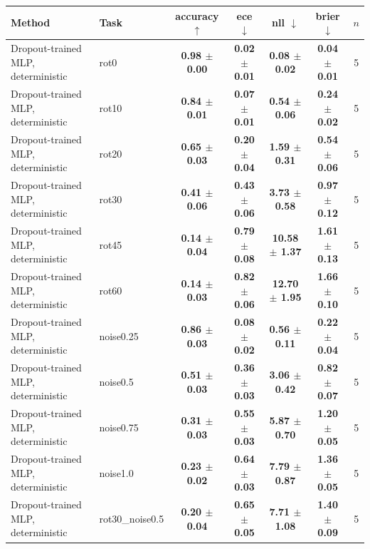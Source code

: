 \begin{tabular}{llccccc}
\toprule
Method & Task & accuracy $\uparrow$ & ece $\downarrow$ & nll $\downarrow$ & brier $\downarrow$ & $n$ \\
\midrule
Dropout-trained MLP, deterministic & rot0 & \textbf{0.98 $\pm$ 0.00} & \textbf{0.02 $\pm$ 0.01} & \textbf{0.08 $\pm$ 0.02} & \textbf{0.04 $\pm$ 0.01} & 5 \\
\midrule
Dropout-trained MLP, deterministic & rot10 & \textbf{0.84 $\pm$ 0.01} & \textbf{0.07 $\pm$ 0.01} & \textbf{0.54 $\pm$ 0.06} & \textbf{0.24 $\pm$ 0.02} & 5 \\
\midrule
Dropout-trained MLP, deterministic & rot20 & \textbf{0.65 $\pm$ 0.03} & \textbf{0.20 $\pm$ 0.04} & \textbf{1.59 $\pm$ 0.31} & \textbf{0.54 $\pm$ 0.06} & 5 \\
\midrule
Dropout-trained MLP, deterministic & rot30 & \textbf{0.41 $\pm$ 0.06} & \textbf{0.43 $\pm$ 0.06} & \textbf{3.73 $\pm$ 0.58} & \textbf{0.97 $\pm$ 0.12} & 5 \\
\midrule
Dropout-trained MLP, deterministic & rot45 & \textbf{0.14 $\pm$ 0.04} & \textbf{0.79 $\pm$ 0.08} & \textbf{10.58 $\pm$ 1.37} & \textbf{1.61 $\pm$ 0.13} & 5 \\
\midrule
Dropout-trained MLP, deterministic & rot60 & \textbf{0.14 $\pm$ 0.03} & \textbf{0.82 $\pm$ 0.06} & \textbf{12.70 $\pm$ 1.95} & \textbf{1.66 $\pm$ 0.10} & 5 \\
\midrule
Dropout-trained MLP, deterministic & noise0.25 & \textbf{0.86 $\pm$ 0.03} & \textbf{0.08 $\pm$ 0.02} & \textbf{0.56 $\pm$ 0.11} & \textbf{0.22 $\pm$ 0.04} & 5 \\
\midrule
Dropout-trained MLP, deterministic & noise0.5 & \textbf{0.51 $\pm$ 0.03} & \textbf{0.36 $\pm$ 0.03} & \textbf{3.06 $\pm$ 0.42} & \textbf{0.82 $\pm$ 0.07} & 5 \\
\midrule
Dropout-trained MLP, deterministic & noise0.75 & \textbf{0.31 $\pm$ 0.03} & \textbf{0.55 $\pm$ 0.03} & \textbf{5.87 $\pm$ 0.70} & \textbf{1.20 $\pm$ 0.05} & 5 \\
\midrule
Dropout-trained MLP, deterministic & noise1.0 & \textbf{0.23 $\pm$ 0.02} & \textbf{0.64 $\pm$ 0.03} & \textbf{7.79 $\pm$ 0.87} & \textbf{1.36 $\pm$ 0.05} & 5 \\
\midrule
Dropout-trained MLP, deterministic & rot30\_noise0.5 & \textbf{0.20 $\pm$ 0.04} & \textbf{0.65 $\pm$ 0.05} & \textbf{7.71 $\pm$ 1.08} & \textbf{1.40 $\pm$ 0.09} & 5 \\
\bottomrule
\end{tabular}

